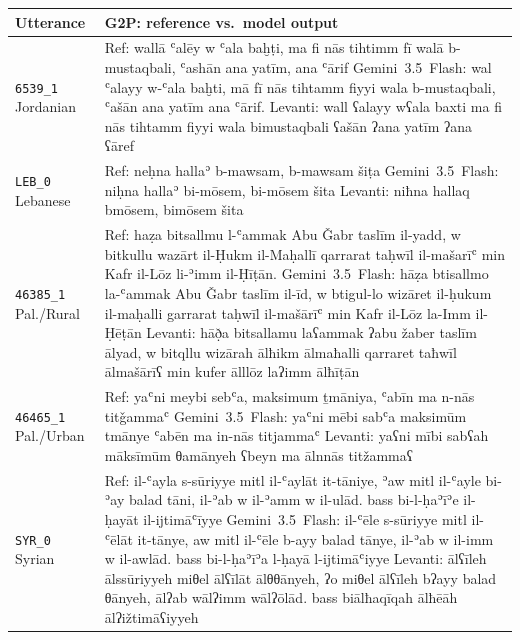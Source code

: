 \begin{table}[t]
\centering
\small
\begin{tabular}{p{} p{}}
\toprule
\textbf{Utterance} & \textbf{G2P: reference vs.\ model output} \\
\midrule
\texttt{6539\_1} \newline \scriptsize Jordanian & Ref: wallā ʿalēy w ʿala baḫṭi, ma fi nās tihtimm fī walā b-mustaqbali, ʿashān ana yatīm, ana ʿārif \newline Gemini~3.5~Flash: wal ʿalayy w-ʿala baḫti, mā fī nās tihtamm fiyyi wala b-mustaqbali, ʿašān ana yatīm ana ʿārif. \newline Levanti: wall ʕalayy wʕala baxti ma fi nās tihtamm fiyyi wala bimustaqbali ʕašān ʔana yatīm ʔana ʕāref \\
\addlinespace[4pt]
\texttt{LEB\_0} \newline \scriptsize Lebanese & Ref: neḥna hallaʾ b-mawsam, b-mawsam šiṭa \newline Gemini~3.5~Flash: niḥna hallaʾ bi-mōsem, bi-mōsem šita \newline Levanti: niħna hallaq bmōsem, bimōsem šita \\
\addlinespace[4pt]
\texttt{46385\_1} \newline \scriptsize Pal./Rural & Ref: haẓa bitsallmu l-ʿammak Abu Ǧabr taslīm il-yadd, w bitkullu wazārt il-Ḥukm il-Maḥallī qarrarat taḥwīl il-mašarīʿ min Kafr il-Lōz li-ʾimm il-Ḥīṭān. \newline Gemini~3.5~Flash: hāẓa btisallmo la-ʿammak Abu Ǧabr taslīm il-īd, w btigul-lo wizāret il-ḥukum il-maḥalli garrarat taḥwīl il-mašārīʿ min Kafr il-Lōz la-Imm il-Ḥēṭān \newline Levanti: hāð̣a bitsallamu laʕammak ʔabu žaber taslīm ālyad, w bitqllu wizārah ālħikm ālmaħalli qarraret taħwīl ālmašārīʕ min kufer ālllōz laʔimm ālħīṭān \\
\addlinespace[4pt]
\texttt{46465\_1} \newline \scriptsize Pal./Urban & Ref: yaʿni meybi sebʿa, maksimum ṯmāniya, ʿabīn ma n-nās titǧammaʿ \newline Gemini~3.5~Flash: yaʿni mēbi sabʿa maksimūm tmānye ʿabēn ma in-nās titjammaʿ \newline Levanti: yaʕni mībi sabʕah māksīmūm θamānyeh ʕbeyn ma ālnnās titžammaʕ \\
\addlinespace[4pt]
\texttt{SYR\_0} \newline \scriptsize Syrian & Ref: il-ʿayla s-sūriyye mitl il-ʿaylāt it-tāniye, ʾaw mitl il-ʿayle bi-ʾay balad tāni, il-ʾab w il-ʾamm w il-ulād. bass bi-l-ḥaʾīʾe il-ḥayāt il-ijtimāʿīyye \newline Gemini~3.5~Flash: il-ʿēle s-sūriyye mitl il-ʿēlāt it-tānye, aw mitl il-ʿēle b-ayy balad tānye, il-ʾab w il-imm w il-awlād. bass bi-l-ḥaʾīʾa l-ḥayā l-ijtimāʿiyye \newline Levanti: ālʕīleh ālssūriyyeh miθel ālʕīlāt ālθθānyeh, ʔo miθel ālʕīleh bʔayy balad θānyeh, ālʔab wālʔimm wālʔōlād. bass biālħaqīqah ālħēāh ālʔižtimāʕiyyeh \\

\end{tabular}
\end{table}
